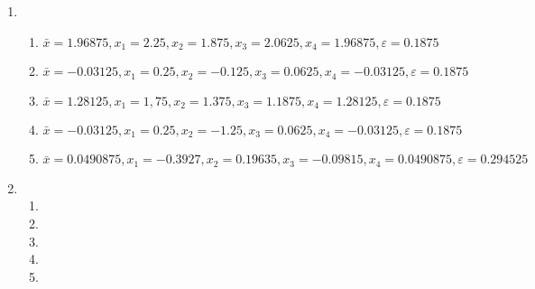 \documentclass[a4paper]{article}
\providecommand{\sin}{} \renewcommand{\sin}{\hspace{2pt}\mathrm{sen}}
\begin{document}
\begin{enumerate}
\item %

  \begin{enumerate}
  \item $\bar{x}=1.96875, x_1=2.25, x_2=1.875, x_3=2.0625, x_4=1.96875, \varepsilon=0.1875$ %
  \item $\bar{x}=-0.03125, x_1=0.25, x_2=-0.125, x_3=0.0625, x_4=-0.03125, \varepsilon=0.1875$ %
  \item $\bar{x}=1.28125, x_1=1,75, x_2=1.375, x_3=1.1875, x_4=1.28125, \varepsilon=0.1875$ %
  \item $\bar{x}=-0.03125, x_1=0.25, x_2=-1.25, x_3=0.0625, x_4=-0.03125, \varepsilon=0.1875$ %
  \item $\bar{x}=0.0490875, x_1=-0.3927, x_2=0.19635, x_3=-0.09815, x_4=0.0490875, \varepsilon=0.294525$ %
  \end{enumerate}

\item %
  \begin{enumerate}
  \item %
  \item %
  \item %
  \item %
  \item %
  \end{enumerate}


\end{enumerate}
\end{document}
